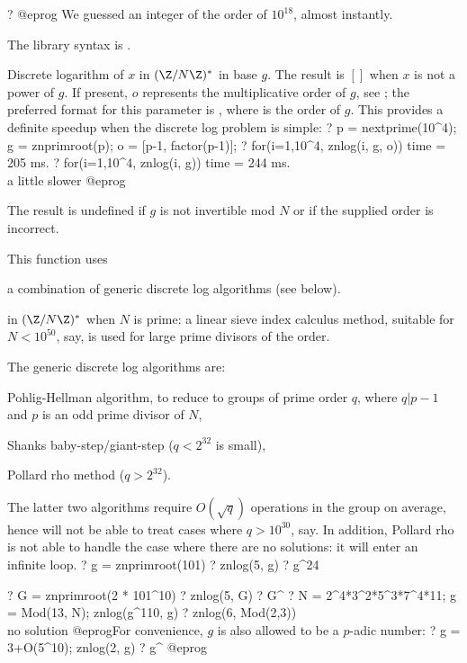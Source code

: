? %
@eprog\noindent
We guessed an integer of the order of $10^{18}$, almost instantly.

The library syntax is .

\label{se:znlog}
Discrete logarithm of $x$ in $(\Z/N\Z)^*$ in base $g$.
The result is $[]$ when $x$ is not a power of $g$.
If present, $o$ represents the multiplicative order of $g$, see
; the preferred format for this parameter is
, where  is the order of $g$.
This provides a definite speedup when the discrete log problem is simple:
\bprog
? p = nextprime(10^4); g = znprimroot(p); o = [p-1, factor(p-1)];
? for(i=1,10^4, znlog(i, g, o))
time = 205 ms.
? for(i=1,10^4, znlog(i, g))
time = 244 ms. \\ a little slower
@eprog

The result is undefined if $g$ is not invertible mod $N$ or if the supplied
order is incorrect.

This function uses

\item a combination of generic discrete log algorithms (see below).

\item in $(\Z/N\Z)^*$ when $N$ is prime: a linear sieve index calculus
method, suitable for $N < 10^{50}$, say, is used for large prime divisors of
the order.

The generic discrete log algorithms are:

\item Pohlig-Hellman algorithm, to reduce to groups of prime order $q$,
where $q | p-1$ and $p$ is an odd prime divisor of $N$,

\item Shanks baby-step/giant-step ($q < 2^{32}$ is small),

\item Pollard rho method ($q > 2^{32}$).

The latter two algorithms require $O(\sqrt{q})$ operations in the group on
average, hence will not be able to treat cases where $q > 10^{30}$, say.
In addition, Pollard rho is not able to handle the case where there are no
solutions: it will enter an infinite loop.
\bprog
? g = znprimroot(101)
? znlog(5, g)
? g^24

? G = znprimroot(2 * 101^10)
? znlog(5, G)
? G^%
? N = 2^4*3^2*5^3*7^4*11; g = Mod(13, N); znlog(g^110, g)
? znlog(6, Mod(2,3))  \\ no solution
@eprog\noindent For convenience, $g$ is also allowed to be a $p$-adic number:
\bprog
? g = 3+O(5^10); znlog(2, g)
? g^%
@eprog

